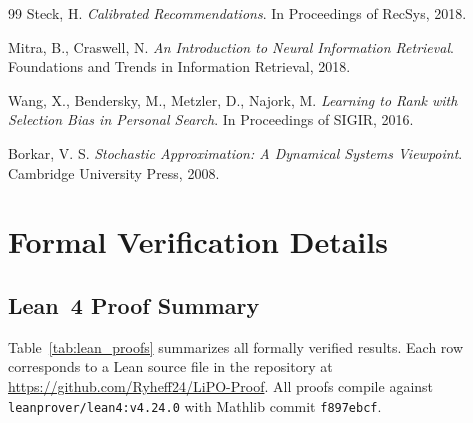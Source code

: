 \documentclass[11pt,a4paper]{article}
\theoremstyle{definition}
\theoremstyle{plain}
\theoremstyle{remark}
\begin{document}
\begin{thebibliography}{99}
Steck, H.
\textit{Calibrated Recommendations}.
In Proceedings of RecSys, 2018.

Mitra, B., Craswell, N.
\textit{An Introduction to Neural Information Retrieval}.
Foundations and Trends in Information Retrieval, 2018.

Wang, X., Bendersky, M., Metzler, D., Najork, M.
\textit{Learning to Rank with Selection Bias in Personal Search}.
In Proceedings of SIGIR, 2016.

Borkar, V. S.
\textit{Stochastic Approximation: A Dynamical Systems Viewpoint}.
Cambridge University Press, 2008.

\end{thebibliography}

\newpage
\appendix

\section{Formal Verification Details}
\label{app:verification}

\subsection{Lean~4 Proof Summary}
\label{app:lean_summary}

Table~\ref{tab:lean_proofs} summarizes all formally verified results. Each row corresponds to a Lean source file in the repository at \url{https://github.com/Ryheff24/LiPO-Proof}. All proofs compile against \texttt{leanprover/lean4:v4.24.0} with Mathlib commit \texttt{f897ebcf}.
\end{document}
